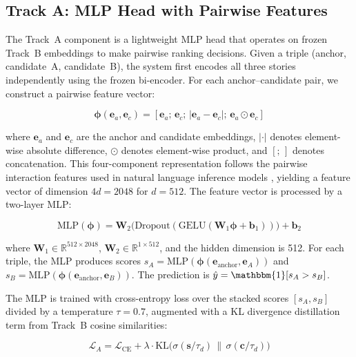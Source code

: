 \documentclass[11pt]{article}
\begin{document}
\subsection{Track A: MLP Head with Pairwise Features}

The Track~A component is a lightweight MLP head that operates on frozen Track~B embeddings to make pairwise ranking decisions. Given a triple (anchor, candidate~A, candidate~B), the system first encodes all three stories independently using the frozen bi-encoder. For each anchor--candidate pair, we construct a pairwise feature vector:

\begin{equation}
\boldsymbol{\phi}(\mathbf{e}_a, \mathbf{e}_c) = [\mathbf{e}_a;\, \mathbf{e}_c;\, |\mathbf{e}_a - \mathbf{e}_c|;\, \mathbf{e}_a \odot \mathbf{e}_c]
\end{equation}

\noindent where $\mathbf{e}_a$ and $\mathbf{e}_c$ are the anchor and candidate embeddings, $|\cdot|$ denotes element-wise absolute difference, $\odot$ denotes element-wise product, and $[;\,]$ denotes concatenation. This four-component representation follows the pairwise interaction features used in natural language inference models \cite{conneau-etal-2017-infersent}, yielding a feature vector of dimension $4d = 2048$ for $d = 512$. The feature vector is processed by a two-layer MLP:

\begin{equation}
\text{MLP}(\boldsymbol{\phi}) = \mathbf{W}_2 \bigl(\text{Dropout}(\text{GELU}(\mathbf{W}_1 \boldsymbol{\phi} + \mathbf{b}_1))\bigr) + \mathbf{b}_2
\end{equation}

\noindent where $\mathbf{W}_1 \in \mathbb{R}^{512 \times 2048}$, $\mathbf{W}_2 \in \mathbb{R}^{1 \times 512}$, and the hidden dimension is 512. For each triple, the MLP produces scores $s_A = \text{MLP}(\boldsymbol{\phi}(\mathbf{e}_{\text{anchor}}, \mathbf{e}_A))$ and $s_B = \text{MLP}(\boldsymbol{\phi}(\mathbf{e}_{\text{anchor}}, \mathbf{e}_B))$. The prediction is $\hat{y} = \mathbbm{1}[s_A > s_B]$.

The MLP is trained with cross-entropy loss over the stacked scores $[s_A, s_B]$ divided by a temperature $\tau = 0.7$, augmented with a KL divergence distillation term from Track~B cosine similarities:

\begin{equation}
\mathcal{L}_A = \mathcal{L}_{\text{CE}} + \lambda \cdot \text{KL}\bigl(\sigma(\mathbf{s} / \tau_d) \,\|\, \sigma(\mathbf{c} / \tau_d)\bigr)
\end{equation}
\end{document}
